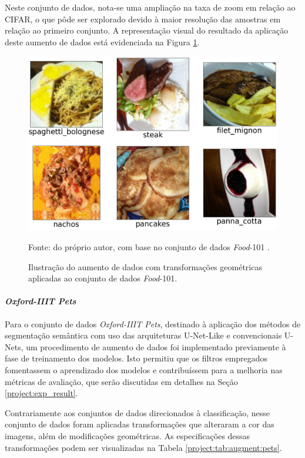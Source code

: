 Neste conjunto de dados, nota-se uma ampliação na taxa de zoom em relação ao CIFAR, o que pôde ser explorado devido à maior resolução das amostras em relação ao primeiro conjunto. A representação visual do resultado da aplicação deste aumento de dados está evidenciada na Figura \ref{project:fig:augment:food}.

\begin{figure}[H]
    \centering
    \caption{Ilustração do aumento de dados com transformações geométricas aplicadas ao conjunto de dados \textit{Food}-101.}
    \label{project:fig:augment:food}
    \includegraphics[width=1\textwidth]{recursos/imagens/project/dataaugmentation_food.png}

    Fonte: do próprio autor, com base no conjunto de dados \textit{Food}-101 \citep{Bossard2014Food-101Forests}.
\end{figure}


\paragraph{\textit{Oxford-IIIT Pets}}
\label{project:augment:pets}
Para o conjunto de dados \textit{Oxford-IIIT Pets}, destinado à aplicação dos métodos de segmentação semântica com uso das arquiteturas U-Net-Like e convencionais U-Nets, um procedimento de aumento de dados foi implementado previamente à fase de treinamento dos modelos. Isto permitiu que os filtros empregados fomentassem o aprendizado dos modelos e contribuíssem para a melhoria nas métricas de avaliação, que serão discutidas em detalhes na Seção \ref{project:exp_result}.

Contrariamente aos conjuntos de dados direcionados à classificação, nesse conjunto de dados foram aplicadas transformações que alteraram a cor das imagens, além de modificações geométricas. As especificações dessas transformações podem ser visualizadas na Tabela \ref{project:tab:augment:pets}.

